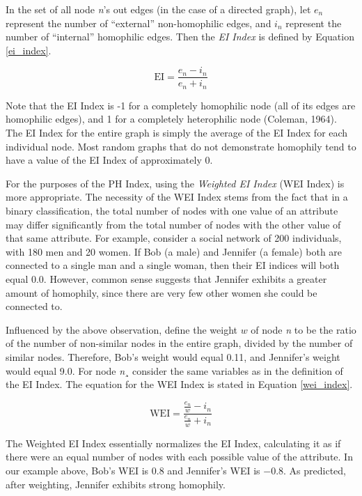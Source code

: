 \documentclass{article}
\begin{document}
In the set of all node \emph{n}'s out edges (in the case of a directed
graph), let \(e_{n}\) represent the number of ``external''
non-homophilic edges, and \(i_{n}\) represent the number of ``internal''
homophilic edges. Then the \emph{EI Index} is defined by Equation \ref{ei_index}.

\begin{equation}
\label{ei_index}
\mathrm{EI} = \frac{e_{n} - i_{n}}{e_{n} + i_{n}}
\end{equation}


Note that the EI Index is -1 for a completely homophilic node (all of
its edges are homophilic edges), and 1 for a completely heterophilic
node (Coleman, 1964). The EI Index for the entire graph is simply the
average of the EI Index for each individual node. Most random graphs
that do not demonstrate homophily tend to have a value of the EI Index
of approximately 0.

For the purposes of the PH Index, using the \emph{Weighted EI Index}
(WEI Index) is more appropriate. The necessity of the WEI Index stems
from the fact that in a binary classification, the total number of nodes
with one value of an attribute may differ significantly from the total
number of nodes with the other value of that same attribute. For
example, consider a social network of 200 individuals, with 180 men and
20 women. If Bob (a male) and Jennifer (a female) both are connected to
a single man and a single woman, then their EI indices will both equal
\(0.0\). However, common sense suggests that Jennifer exhibits a greater
amount of homophily, since there are very few other women she could be
connected to.

Influenced by the above observation, define the weight \(w\) of node
\emph{n} to be the ratio of the number of non-similar nodes in the
entire graph, divided by the number of similar nodes. Therefore, Bob's
weight would equal 0.11, and Jennifer's weight would equal 9.0. For node
\emph{n}¸ consider the same variables as in the definition of the EI
Index. The equation for the WEI Index is stated in Equation \ref{wei_index}.

\begin{equation}
\label{wei_index}
\mathrm{WEI} = \frac{\frac{e_{n}}{w} - i_{n}}{\frac{e_{n}}{w} + i_{n}}
\end{equation}


The Weighted EI Index essentially normalizes the EI Index, calculating
it as if there were an equal number of nodes with each possible value of
the attribute. In our example above, Bob's WEI is \(0.8\) and Jennifer's
WEI is \(- 0.8\). As predicted, after weighting, Jennifer exhibits
strong homophily.
\end{document}
